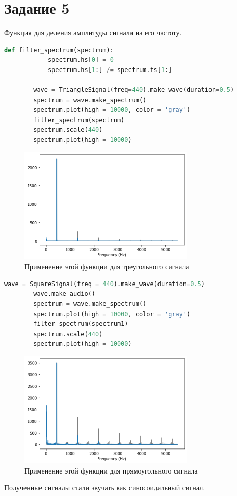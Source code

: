 \documentclass[a4paper, 12pt]{report}
\begin{document}
	\section{Задание 5}
	Функция для деления амплитуды сигнала на его частоту.
	 \begin{lstlisting}[language=Python,caption=Сама функция]
		def filter_spectrum(spectrum):
   			spectrum.hs[0] = 0
   			spectrum.hs[1:] /= spectrum.fs[1:]

		wave = TriangleSignal(freq=440).make_wave(duration=0.5)
		spectrum = wave.make_spectrum()
		spectrum.plot(high = 10000, color = 'gray')
		filter_spectrum(spectrum)
		spectrum.scale(440)
		spectrum.plot(high = 10000)
	\end{lstlisting}
	\begin{figure}[H]
		\centering
		\includegraphics[width=0.75\textwidth]{test1.png}
		\caption{Применение этой функции для треугольного сигнала}
		\label{fig:test1}
	\end{figure}
	\begin{lstlisting}[language=Python,caption=Теперь возьмём прямоугольный сигнал]
		wave = SquareSignal(freq = 440).make_wave(duration=0.5)
		wave.make_audio()
		spectrum = wave.make_spectrum()
		spectrum.plot(high = 10000, color = 'gray')
		filter_spectrum(spectrum1)
		spectrum.scale(440)
		spectrum.plot(high = 10000)
	\end{lstlisting}
	\begin{figure}[H]
		\centering
		\includegraphics[width=0.75\textwidth]{test2.png}
		\caption{Применение этой функции для прямоугольного сигнала}
		\label{fig:test2}
	\end{figure}
	Полученные сигналы стали звучать как синосоидальный сигнал.
\end{document}
